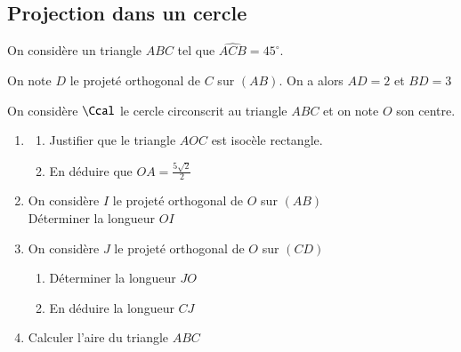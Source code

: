 \documentclass[oneside,12pt]{article}          %
\begin{document}
\subsection{Projection dans un cercle}
\begin{minipage}{0.55\linewidth} \restoreskip
	On considère un triangle $ABC$ tel que $\widehat{ACB}=45^\circ$. 
	
	On note $D$ le projeté orthogonal de $C$ sur $(AB)$. On a alors $AD=2$ et $BD=3$ 
	
	On considère $\Ccal$ le cercle circonscrit au triangle $ABC$ et on note $O$ son centre.
	\begin{enumerate}
		\item \begin{enumerate}
			\item Justifier que le triangle $AOC$ est isocèle rectangle.
			\item En déduire que $OA=\frac{5\sqrt{2}}{2}$
		\end{enumerate}
		\item On considère $I$ le projeté orthogonal de $O$ sur $(AB)$ \\
		Déterminer la longueur $OI$
		\item On considère $J$ le projeté orthogonal de $O$ sur $(CD)$
		\begin{enumerate}
			\item Déterminer la longueur $JO$
			\item En déduire la longueur $CJ$
		\end{enumerate}
		\item Calculer l'aire du triangle $ABC$				
	\end{enumerate}
\end{minipage} \hspace{5mm} 
\begin{minipage}{0.35\linewidth} \vspace{-15mm}
\end{minipage}
\end{document}
